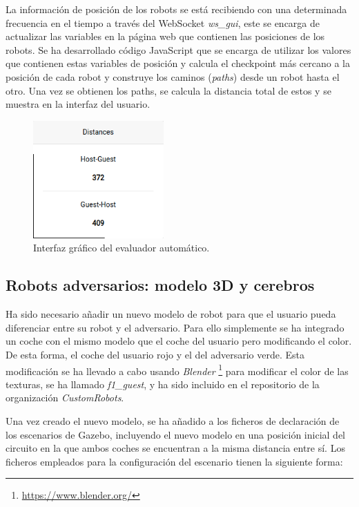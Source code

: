 \documentclass[a4paper, 12pt]{book}
\begin{document}
La información de posición de los robots se está recibiendo con una determinada frecuencia en el tiempo a través del WebSocket \emph{ws\_gui}, este se encarga de actualizar las variables en la página web que contienen las posiciones de los robots. Se ha desarrollado código JavaScript que se encarga de utilizar los valores que contienen estas variables de posición y calcula el checkpoint más cercano a la posición de cada robot y construye los caminos (\emph{paths}) desde un robot hasta el otro. Una vez se obtienen los paths, se calcula la distancia total de estos y se muestra en la interfaz del usuario.

\begin{figure}[H]
	\centering
    \includegraphics[width=5cm]{img/evaluator_follow_line.png}
    \caption{Interfaz gráfico del evaluador automático.}
    \label{figura:keyhandler}
\end{figure}

\subsection{Robots adversarios: modelo 3D y cerebros}
\label{follow_line_game_adversarios}

Ha sido necesario añadir un nuevo modelo de robot para que el usuario pueda diferenciar entre su robot y el adversario. Para ello simplemente se ha integrado un coche con el mismo modelo que el coche del usuario pero modificando el color. De esta forma, el coche del usuario rojo y el del adversario verde. Esta modificación se ha llevado a cabo usando \emph{Blender} \footnote{\url{https://www.blender.org/}} para modificar el color de las texturas, se ha llamado \emph{f1\_guest}, y ha sido  incluido en el repositorio de la organización \emph{CustomRobots}.

Una vez creado el nuevo modelo, se ha añadido a los ficheros de declaración de los escenarios de Gazebo, incluyendo el nuevo modelo en una posición inicial del circuito en la que ambos coches se encuentran a la misma distancia entre sí. Los ficheros empleados para la configuración del escenario tienen la siguiente forma:
\end{document}
